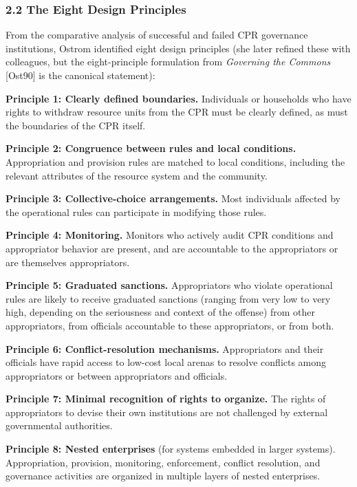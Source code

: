 \documentclass[
  11pt,
  letterpaper,
]{article}
\begin{document}
\subsubsection{2.2 The Eight Design
Principles}\label{the-eight-design-principles}

From the comparative analysis of successful and failed CPR governance
institutions, Ostrom identified eight design principles (she later
refined these with colleagues, but the eight-principle formulation from
\emph{Governing the Commons} {[}Ost90{]} is the canonical statement):

\textbf{Principle 1: Clearly defined boundaries.} Individuals or
households who have rights to withdraw resource units from the CPR must
be clearly defined, as must the boundaries of the CPR itself.

\textbf{Principle 2: Congruence between rules and local conditions.}
Appropriation and provision rules are matched to local conditions,
including the relevant attributes of the resource system and the
community.

\textbf{Principle 3: Collective-choice arrangements.} Most individuals
affected by the operational rules can participate in modifying those
rules.

\textbf{Principle 4: Monitoring.} Monitors who actively audit CPR
conditions and appropriator behavior are present, and are accountable to
the appropriators or are themselves appropriators.

\textbf{Principle 5: Graduated sanctions.} Appropriators who violate
operational rules are likely to receive graduated sanctions (ranging
from very low to very high, depending on the seriousness and context of
the offense) from other appropriators, from officials accountable to
these appropriators, or from both.

\textbf{Principle 6: Conflict-resolution mechanisms.} Appropriators and
their officials have rapid access to low-cost local arenas to resolve
conflicts among appropriators or between appropriators and officials.

\textbf{Principle 7: Minimal recognition of rights to organize.} The
rights of appropriators to devise their own institutions are not
challenged by external governmental authorities.

\textbf{Principle 8: Nested enterprises} (for systems embedded in larger
systems). Appropriation, provision, monitoring, enforcement, conflict
resolution, and governance activities are organized in multiple layers
of nested enterprises.
\end{document}
